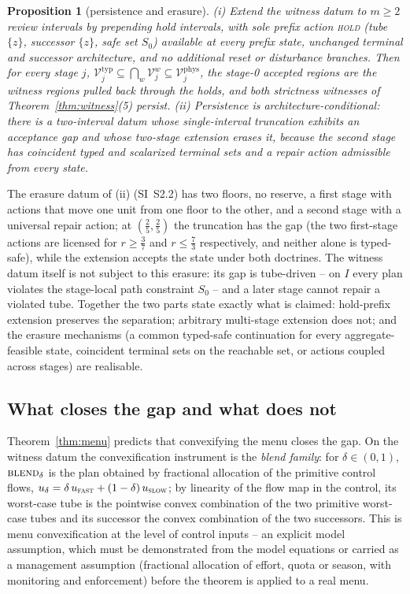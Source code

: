 \documentclass[preprint,11pt,authoryear]{elsarticle}
\newtheorem{proposition}{Proposition}
\theoremstyle{definition}
\theoremstyle{remark}
\newcommand{\act}[1]{\textsc{#1}}
\begin{document}
\begin{proposition}[persistence and erasure]\label{prop:persist}
\textup{(i)} Extend the witness datum to $m\ge2$ review intervals by prepending hold intervals, with sole prefix action \act{hold} (tube $\{z\}$, successor $\{z\}$, safe set $S_0$) available at every prefix state, unchanged terminal and successor architecture, and no additional reset or disturbance branches. Then for every stage $j$, $\mathcal V^{\mathrm{typ}}_j\subseteq\bigcap_{w}\mathcal V^{w}_j\subseteq\mathcal V^{\mathrm{phys}}_j$, the stage-0 accepted regions are the witness regions pulled back through the holds, and both strictness witnesses of Theorem~\ref{thm:witness}(5) persist.
\textup{(ii)} Persistence is architecture-conditional: there is a two-interval datum whose single-interval truncation exhibits an acceptance gap and whose two-stage extension erases it, because the second stage has coincident typed and scalarized terminal sets and a repair action admissible from every state.
\end{proposition}

The erasure datum of (ii) (SI~S2.2) has two floors, no reserve, a first stage with actions that move one unit from one floor to the other, and a second stage with a universal repair action; at $(\tfrac25,\tfrac25)$ the truncation has the gap (the two first-stage actions are licensed for $r\ge\tfrac37$ and $r\le\tfrac73$ respectively, and neither alone is typed-safe), while the extension accepts the state under both doctrines. The witness datum itself is not subject to this erasure: its gap is tube-driven -- on $I$ every plan violates the stage-local path constraint $S_0$ -- and a later stage cannot repair a violated tube. Together the two parts state exactly what is claimed: hold-prefix extension preserves the separation; arbitrary multi-stage extension does not; and the erasure mechanisms (a common typed-safe continuation for every aggregate-feasible state, coincident terminal sets on the reachable set, or actions coupled across stages) are realisable.

\subsection{What closes the gap and what does not}\label{sec:closing}

Theorem~\ref{thm:menu} predicts that convexifying the menu closes the gap. On the witness datum the convexification instrument is the \emph{blend family}: for $\delta\in(0,1)$, $\act{blend}_\delta$ is the plan obtained by fractional allocation of the primitive control flows, $u_\delta=\delta\,u_{\act{fast}}+(1-\delta)\,u_{\act{slow}}$; by linearity of the flow map in the control, its worst-case tube is the pointwise convex combination of the two primitive worst-case tubes and its successor the convex combination of the two successors. This is menu convexification at the level of control inputs -- an explicit model assumption, which must be demonstrated from the model equations or carried as a management assumption (fractional allocation of effort, quota or season, with monitoring and enforcement) before the theorem is applied to a real menu.
\end{document}
